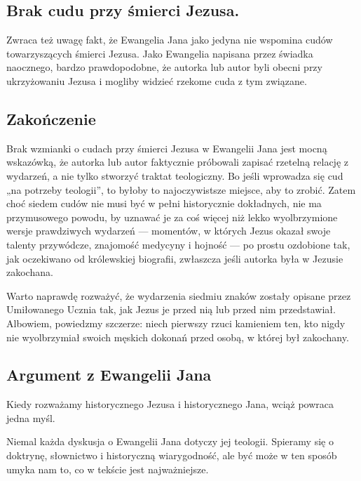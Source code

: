 \subsection{Brak cudu przy śmierci Jezusa.}\label{subsec:the-non-miracle-at-the-death-of-jesus.}

Zwraca też uwagę fakt, że Ewangelia Jana jako jedyna nie wspomina cudów towarzyszących śmierci Jezusa.
Jako Ewangelia napisana przez świadka naocznego, bardzo prawdopodobne, że autorka lub autor byli obecni przy ukrzyżowaniu Jezusa i mogliby widzieć rzekome cuda z tym związane.

\subsection{Zakończenie}\label{subsec:conclusion}

Brak wzmianki o cudach przy śmierci Jezusa w Ewangelii Jana jest mocną wskazówką, że autorka lub autor faktycznie próbowali zapisać rzetelną relację z wydarzeń, a nie tylko stworzyć traktat teologiczny.
Bo jeśli wprowadza się cud „na potrzeby teologii”, to byłoby to najoczywistsze miejsce, aby to zrobić.
Zatem choć siedem cudów nie musi być w pełni historycznie dokładnych, nie ma przymusowego powodu, by uznawać je za coś więcej niż lekko wyolbrzymione wersje prawdziwych wydarzeń --- momentów, w których Jezus okazał swoje talenty przywódcze, znajomość medycyny i hojność --- po prostu ozdobione tak, jak oczekiwano od królewskiej biografii, zwłaszcza jeśli autorka była w Jezusie zakochana.

Warto naprawdę rozważyć, że wydarzenia siedmiu znaków zostały opisane przez Umiłowanego Ucznia tak, jak Jezus je przed nią lub przed nim przedstawiał.
Albowiem, powiedzmy szczerze: niech pierwszy rzuci kamieniem ten, kto nigdy nie wyolbrzymiał swoich męskich dokonań przed osobą, w której był zakochany.

\subsection{Argument z Ewangelii Jana}

\label{subsec:the-gospel-of-john-point}

Kiedy rozważamy historycznego Jezusa i historycznego Jana, wciąż powraca jedna myśl.

Niemal każda dyskusja o Ewangelii Jana dotyczy jej teologii.
Spieramy się o doktrynę, słownictwo i historyczną wiarygodność, ale być może w ten sposób umyka nam to, co w tekście jest najważniejsze.

